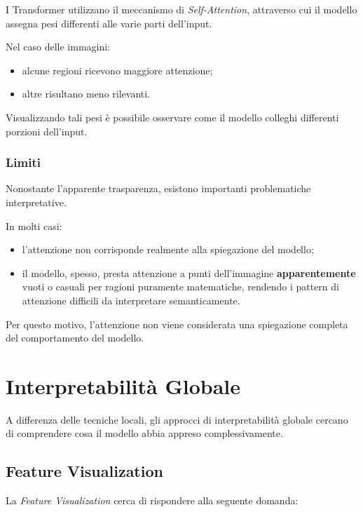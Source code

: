 I Transformer utilizzano il meccanismo di \textit{Self-Attention}, attraverso cui il modello assegna pesi differenti alle varie parti dell'input.

Nel caso delle immagini:

\begin{itemize}
    \item alcune regioni ricevono maggiore attenzione;
    \item altre risultano meno rilevanti.
\end{itemize}

Visualizzando tali pesi è possibile osservare come il modello colleghi differenti porzioni dell'input.

\subsubsection{Limiti}

Nonostante l'apparente trasparenza, esistono importanti problematiche interpretative.

In molti casi:

\begin{itemize}
    \item l'attenzione non corrisponde realmente alla spiegazione del modello;
        
    \item il modello, spesso, presta attenzione a punti dell'immagine \textbf{apparentemente} vuoti o casuali per ragioni puramente matematiche, rendendo i pattern di attenzione difficili da interpretare semanticamente.
\end{itemize}

Per questo motivo, l'attenzione non viene considerata una spiegazione completa del comportamento del modello.

\section{Interpretabilità Globale}

A differenza delle tecniche locali, gli approcci di interpretabilità globale cercano di comprendere cosa il modello abbia appreso complessivamente.

\subsection{Feature Visualization}

La \textit{Feature Visualization} cerca di rispondere alla seguente domanda:

